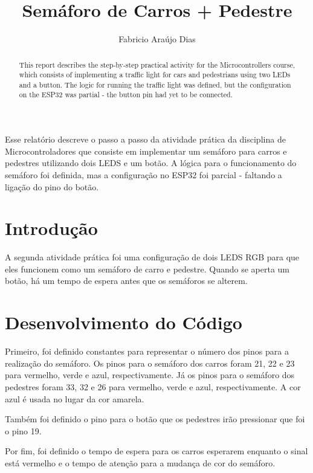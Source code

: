 \documentclass[12pt]{article}
\title{Semáforo de Carros + Pedestre}
\author{Fabricio Araújo Dias}
\begin{document}
 

\maketitle

\begin{abstract}
  This report describes the step-by-step practical activity for the Microcontrollers course, which consists of implementing a traffic light for cars and pedestrians using two LEDs and a button. The logic for running the traffic light was defined, but the configuration on the ESP32 was partial - the button pin had yet to be connected.
\end{abstract}
     
\begin{resumo} 
  Esse relatório descreve o passo a passo da atividade prática da disciplina de Microcontroladores que consiste em implementar um semáforo para carros e pedestres utilizando dois LEDS e um botão. A lógica para o funcionamento do semáforo foi definida, mas a configuração no ESP32 foi parcial - faltando a ligação do pino do botão.
\end{resumo}


\section{Introdução}\label{sec:introdução}
A segunda atividade prática foi uma configuração de dois LEDS RGB para que eles funcionem como um semáforo de carro e pedestre. Quando se aperta um botão, há um tempo de espera antes que os semáforos se alterem.

\section{Desenvolvimento do Código}\label{sec:desenvolvimento-do-código}

Primeiro, foi definido constantes para representar o número dos pinos para a realização do semáforo. Os pinos para o semáforo dos carros foram 21, 22 e 23 para vermelho, verde e azul, respectivamente. Já os pinos para o semáforo dos pedestres foram 33, 32 e 26 para vermelho, verde e azul, respectivamente. A cor azul é usada no lugar da cor amarela.

Também foi definido o pino para o botão que os pedestres irão pressionar que foi o pino 19.

Por fim, foi definido o tempo de espera para os carros esperarem enquanto o sinal está vermelho e o tempo de atenção para a mudança de cor do semáforo.
\end{document}
